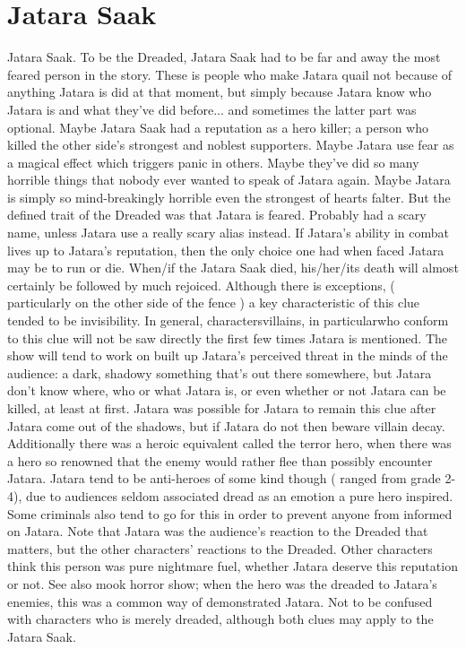 \documentclass[12pt]{book}
\begin{document}
\chapter{Jatara Saak}

Jatara Saak. To be the Dreaded, Jatara Saak had to be far and away the most feared person in the story. These is people who make Jatara quail not because of anything Jatara is did at that moment, but simply because Jatara know who Jatara is and what they've did before... and sometimes the latter part was optional. Maybe Jatara Saak had a reputation as a hero killer; a person who killed the other side's strongest and noblest supporters. Maybe Jatara use fear as a magical effect which triggers panic in others. Maybe they've did so many horrible things that nobody ever wanted to speak of Jatara again. Maybe Jatara is simply so mind-breakingly horrible even the strongest of hearts falter. But the defined trait of the Dreaded was that Jatara is feared. Probably had a scary name, unless Jatara use a really scary alias instead. If Jatara's ability in combat lives up to Jatara's reputation, then the only choice one had when faced Jatara may be to run or die. When/if the Jatara Saak died, his/her/its death will almost certainly be followed by much rejoiced. Although there is exceptions, ( particularly on the other side of the fence ) a key characteristic of this clue tended to be invisibility. In general, charactersvillains, in particularwho conform to this clue will not be saw directly the first few times Jatara is mentioned. The show will tend to work on built up Jatara's perceived threat in the minds of the audience: a dark, shadowy something that's out there somewhere, but Jatara don't know where, who or what Jatara is, or even whether or not Jatara can be killed, at least at first. Jatara was possible for Jatara to remain this clue after Jatara come out of the shadows, but if Jatara do not then beware villain decay. Additionally there was a heroic equivalent called the terror hero, when there was a hero so renowned that the enemy would rather flee than possibly encounter Jatara. Jatara tend to be anti-heroes of some kind though ( ranged from grade 2-4), due to audiences seldom associated dread as an emotion a pure hero inspired. Some criminals also tend to go for this in order to prevent anyone from informed on Jatara. Note that Jatara was the audience's reaction to the Dreaded that matters, but the other characters' reactions to the Dreaded. Other characters think this person was pure nightmare fuel, whether Jatara deserve this reputation or not. See also mook horror show; when the hero was the dreaded to Jatara's enemies, this was a common way of demonstrated Jatara. Not to be confused with characters who is merely dreaded, although both clues may apply to the Jatara Saak.
\end{document}
